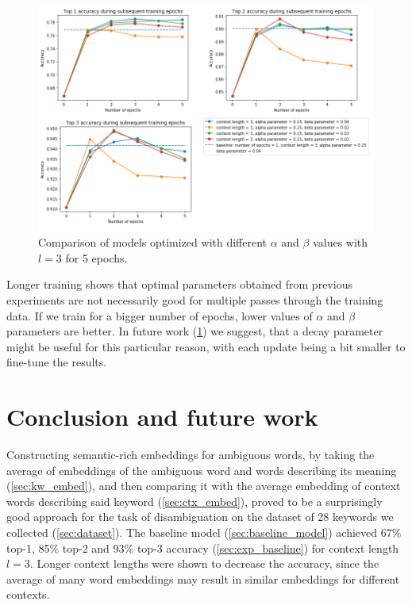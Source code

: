 \documentclass{llncs}
\begin{document}
\begin{figure}
    \centering
    \caption{Comparison of models optimized with different \(\alpha\) and \(\beta\) values with \(l=3\) for 5 epochs.}
    \label{fig:exp4_2_epochs_comparison}
    \includegraphics[scale=0.65]{res/exp4_epoch_multiconfiguration_top_acc.png}
\end{figure}

Longer training shows that optimal parameters obtained from previous experiments are not necessarily good for multiple passes through the training data.
If we train for a bigger number of epochs, lower values of \(\alpha\) and \(\beta\) parameters are better.
In future work (\ref{sec:conclusion}) we suggest, that a decay parameter might be useful for this particular reason, with each update being a bit smaller to fine-tune the results.


\section{Conclusion and future work}
\label{sec:conclusion}
Constructing semantic-rich embeddings for ambiguous words, by taking the average of embeddings of the ambiguous word and words describing its meaning (\ref{sec:kw_embed}), and then comparing it with the average embedding of context words describing said keyword (\ref{sec:ctx_embed}), proved to be a surprisingly good approach for the task of disambiguation on the dataset of 28 keywords we collected (\ref{sec:dataset}).
The baseline model (\ref{sec:baseline_model}) achieved 67\% top-1, 85\% top-2 and 93\% top-3 accuracy (\ref{sec:exp_baseline}) for context length \(l=3\). Longer context lengths were shown to decrease the accuracy, since the average of many word embeddings may result in similar embeddings for different contexts.
\end{document}
